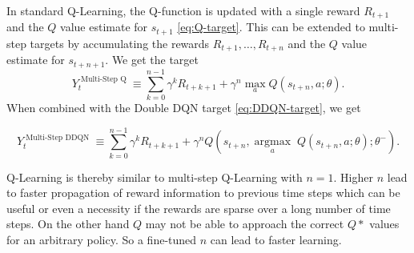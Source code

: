 
In standard Q-Learning, the Q-function is updated with a single reward $R_{t+1}$ and the $Q$ value estimate for $s_{t+1}$ \eqref{eq:Q-target}.
This can be extended to multi-step targets\cite{Sutton1988} by accumulating the rewards $R_{t+1},\dots,R_{t+n}$ and the $Q$ value estimate for $s_{t+n+1}$. We get the target
\begin{equation}
Y_{t}^{\text { Multi-Step Q }} \equiv \sum_{k=0}^{n-1} \gamma^k R_{t+k+1}+\gamma^n \max _{a} Q\left(s_{t+n}, a ; \theta\right).
\end{equation}
When combined with the Double DQN target \eqref{eq:DDQN-target}, we get 

\begin{equation}
Y_{t}^{\text { Multi-Step DDQN }} \equiv \sum_{k=0}^{n-1} \gamma^k R_{t+k+1}+\gamma^n Q\left(s_{t+n}, \underset{a}{\operatorname{argmax}}\; Q\left(s_{t+n}, a ; \theta\right); \theta^{-}\right).
\end{equation}

Q-Learning is thereby similar to multi-step Q-Learning with $n=1$. Higher $n$ lead to faster propagation of reward information to previous time steps which can be useful or even a necessity if the rewards are sparse over a long number of time steps. On the other hand $Q$ may not be able to approach the correct $Q*$ values for an arbitrary policy\cite{Peng1996}. So a fine-tuned $n$ can lead to faster learning.
